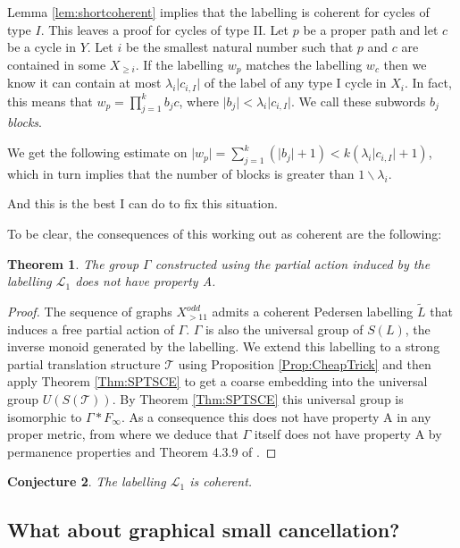 \documentclass[11pt,a4paper]{amsart}
\theoremstyle{plain}
\newtheorem{theorem}{Theorem}%
\newtheorem{conjecture}[theorem]{Conjecture}
\theoremstyle{definition}%
\theoremstyle{remark}%
\begin{document}
Lemma \ref{lem:shortcoherent} implies that the labelling is coherent for cycles of type $I$. This leaves a proof for cycles of type II. Let $p$ be a proper path and let $c$ be a cycle in $Y$. Let $i$ be the smallest natural number such that $p$ and $c$ are contained in some $X_{\geq i}$. If the labelling $w_{p}$ matches the labelling $w_{c}$ then we know it can contain at most $\lambda_{i}\vert c_{i,I} \vert$ of the label of any type I cycle in $X_{i}$. In fact, this means that $w_{p}=\prod_{j=1}^{k}b_{j}c$, where $\vert b_{j} \vert < \lambda_{i}\vert c_{i,I} \vert$. We call these subwords $b_{j}$ \textit{blocks}.

We get the following estimate on $\vert w_{p} \vert = \sum_{j=1}^{k} (\vert b_{j} \vert +1) < k(\lambda_{i}\vert c_{i,I} \vert +1)$, which in turn implies that the number of blocks is greater than $1\backslash \lambda_{i}$.

And this is the best I can do to fix this situation.

To be clear, the consequences of this working out as coherent are the following: 

\begin{theorem}
The group $\Gamma$ constructed using the partial action induced by the labelling $\mathcal{L}_{1}$ does not have property A.
\end{theorem}
\begin{proof}
The sequence of graphs $X_{>11}^{odd}$ admits a coherent Pedersen labelling $\tilde{L}$ that induces a free partial action of $\Gamma$. $\Gamma$ is also the universal group of $S(L)$, the inverse monoid generated by the labelling. We extend this labelling to a strong partial translation structure $\mathcal{T}$ using Proposition \ref{Prop:CheapTrick} and then apply Theorem \ref{Thm:SPTSCE} to get a coarse embedding into the universal group $U(S(\mathcal{T}))$. By Theorem \ref{Thm:SPTSCE} this universal group is isomorphic to $\Gamma \ast F_{\infty}$. As a consequence this does not have property A in any proper metric, from where we deduce that $\Gamma$ itself does not have property A by permanence properties \cite[Guentner]{} and Theorem 4.3.9 of \cite[Rufus' notes on A]{}. 
\end{proof}

\begin{conjecture}
The labelling $\mathcal{L}_{1}$ is coherent.
\end{conjecture}

\subsection{What about graphical small cancellation?}
\end{document}
